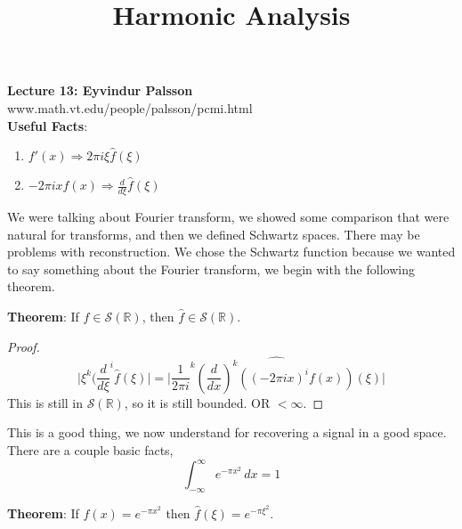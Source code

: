 \documentclass[12pt]{article}
\title{Harmonic Analysis}
\begin{document}
\noindent \textbf{Lecture 13: Eyvindur Palsson} \\
\noindent www.math.vt.edu/people/palsson/pcmi.html \\

\noindent \textbf{Useful Facts}: \\
\noindent 
\begin{enumerate}[itemsep=0pt, parsep=0pt, topsep=0pt, partopsep=0pt, label=(\roman*)]
\addtocounter{enumi}{3}
\item $f'(x) \Longrightarrow 2\pi i \xi \hat{f}(\xi)$
\item $-2\pi ix f(x) \Longrightarrow \frac{d}{d\xi} \hat{f}(\xi)$
\end{enumerate}

\noindent We were talking about Fourier transform, we showed some comparison that were natural for transforms, and then we defined Schwartz spaces. There may be problems with reconstruction. We chose the Schwartz function because we wanted to say something about the Fourier transform, we begin with the following theorem.

\noindent \textbf{Theorem}: If $f \in \mathcal{S}(\mathbb{R})$, then $\hat{f} \in \mathcal{S}(\mathbb{R})$. \\
\begin{proof}
$$ \vert \xi^k (\frac{d}{d\xi}^i \hat{f}(\xi) \vert = \vert \widehat{\frac{1}{2\pi i}^k (\frac{d}{dx})^k ( ( -2\pi ix)^if(x))(\xi)}\vert$$ 
This is still in $\mathcal{S}(\mathbb{R})$, so it is still bounded. OR $< \infty$. 

\end{proof}

This is a good thing, we now understand for recovering a signal in a good space.  \\

There are a couple basic facts,
$$ \int^\infty_{-\infty} e^{-\pi x^2} \, dx = 1$$

\noindent \textbf{Theorem}: If $f(x) = e^{-\pi x^2}$ then $\hat{f}(\xi) = e^{-\pi \xi^2}$. 
\end{document}
